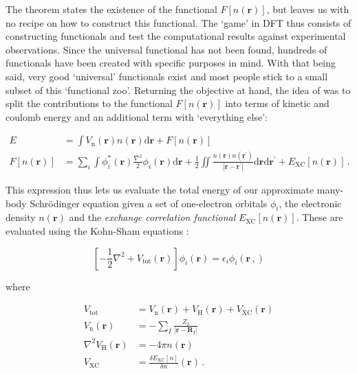 \noindent The theorem states the existence of the functional $F[n(\bm{r})]$, but leaves us with no recipe on how to construct this functional. The `game' in DFT thus consists of constructing functionals and test the computational results against experimental observations. Since the universal functional has not been found, hundreds of functionals \cite{Mardirossian2017} have been created with specific purposes in mind. With that being said, very good `universal' functionals exist and most people stick to a small subset of this `functional zoo'. Returning the objective at hand, the idea of \citeauthor{Kohn1965} \cite{Kohn1965} was to split the contributions to the functional $F[n(\bm{r})]$ into terms of kinetic and coulomb energy and an additional term with `everything else':

\begin{align}
	E &= \int V_\text{n}(\bm{r}) n(\bm{r}) \mathrm{d}\bm{r} + F[n(\bm{r})] \label{eq:ks_toten1} \\
	F[n(\bm{r})] &= \sum_i \int \phi_i^*(\bm{r})\frac{\nabla^2}{2}\phi_i(\bm{r}) \mathrm{d}\bm{r} + \frac{1}{2} \iint \frac{n(\bm{r})n(\bm{r}^\prime)}{|\bm{r}-\bm{r}^\prime|} \mathrm{d}\bm{r} \mathrm{d}\bm{r}^\prime + E_\text{XC}[n(\bm{r})] \, . \label{eq:ks_toten2}
\end{align}

\noindent This expression thus lets us evaluate the total energy of our approximate many-body Schr\"odinger equation given a set of one-electron orbitals $\phi_i$, the electronic density $n(\bm{r})$ and the \emph{exchange correlation functional} $E_\text{XC}[n(\bm{r})]$. These are evaluated using the Kohn-Sham equations \cite{Kohn1965}:

\begin{equation}\label{eq:kohn_sham}
\left[ -\frac{1}{2} \nabla^2 + V_\text{tot}(\bm{r}) \right] \phi_i(\bm{r}) = \epsilon_i \phi_i(\bm{r} \, ,)
\end{equation}

\noindent where

\begin{align}
	V_\text{tot} &= V_\text{n}(\bm{r}) + V_\text{H}(\bm{r}) + V_\text{XC}(\bm{r}) \\
	V_\text{n}(\bm{r}) &= - \sum_I \frac{Z_I}{|\bm{r} - \bm{R}_I|} \label{eq:ks_vn} \\
	\nabla^2 V_\text{H}(\bm{r}) &= -4\pi n(\bm{r}) \\
	V_\text{XC} &= \frac{\delta E_\text{XC}[n]}{\delta n}(\bm{r}) \, .
\end{align}

